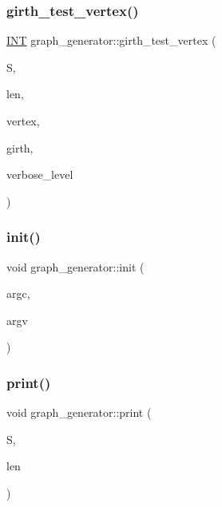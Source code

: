 \subsubsection{\texorpdfstring{girth\+\_\+test\+\_\+vertex()}{girth\_test\_vertex()}}
{\footnotesize\ttfamily \mbox{\hyperlink{galois_8h_a09fddde158a3a20bd2dcadb609de11dc}{I\+NT}} graph\+\_\+generator\+::girth\+\_\+test\+\_\+vertex (\begin{DoxyParamCaption}\item[{\mbox{\hyperlink{galois_8h_a09fddde158a3a20bd2dcadb609de11dc}{I\+NT}} $\ast$}]{S,  }\item[{\mbox{\hyperlink{galois_8h_a09fddde158a3a20bd2dcadb609de11dc}{I\+NT}}}]{len,  }\item[{\mbox{\hyperlink{galois_8h_a09fddde158a3a20bd2dcadb609de11dc}{I\+NT}}}]{vertex,  }\item[{\mbox{\hyperlink{galois_8h_a09fddde158a3a20bd2dcadb609de11dc}{I\+NT}}}]{girth,  }\item[{\mbox{\hyperlink{galois_8h_a09fddde158a3a20bd2dcadb609de11dc}{I\+NT}}}]{verbose\+\_\+level }\end{DoxyParamCaption})}

\mbox{\label{classgraph__generator_acd2ec07214d869173eb1c9ffb3ec0312}} 
\subsubsection{\texorpdfstring{init()}{init()}}
{\footnotesize\ttfamily void graph\+\_\+generator\+::init (\begin{DoxyParamCaption}\item[{int}]{argc,  }\item[{const char $\ast$$\ast$}]{argv }\end{DoxyParamCaption})}

\mbox{\label{classgraph__generator_a66be7852bf6f9099685fcd423fbd1a8a}} 
\subsubsection{\texorpdfstring{print()}{print()}}
{\footnotesize\ttfamily void graph\+\_\+generator\+::print (\begin{DoxyParamCaption}\item[{\mbox{\hyperlink{galois_8h_a09fddde158a3a20bd2dcadb609de11dc}{I\+NT}} $\ast$}]{S,  }\item[{\mbox{\hyperlink{galois_8h_a09fddde158a3a20bd2dcadb609de11dc}{I\+NT}}}]{len }\end{DoxyParamCaption})}

